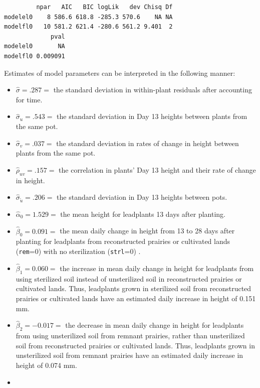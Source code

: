 \documentclass[
]{krantz}
\providecommand{\tightlist}{%
  \setlength{\itemsep}{0pt}\setlength{\parskip}{0pt}}
\begin{document}
\begin{verbatim}
         npar   AIC   BIC logLik   dev Chisq Df
modelel0    8 586.6 618.8 -285.3 570.6    NA NA
modelfl0   10 581.2 621.4 -280.6 561.2 9.401  2
             pval
modelel0       NA
modelfl0 0.009091
\end{verbatim}

Estimates of model parameters can be interpreted in the following manner:

\begin{itemize}
\tightlist
\item
  \(\hat{\sigma}=.287=\) the standard deviation in within-plant residuals after accounting for time.
\item
  \(\hat{\sigma}_{u}=.543=\) the standard deviation in Day 13 heights between plants from the same pot.
\item
  \(\hat{\sigma}_{v}=.037=\) the standard deviation in rates of change in height between plants from the same pot.
\item
  \(\hat{\rho}_{uv}=.157=\) the correlation in plants' Day 13 height and their rate of change in height.
\item
  \(\hat{\sigma}_{\tilde{u}}=.206=\) the standard deviation in Day 13 heights between pots.
\item
  \(\hat{\alpha}_{0}=1.529=\) the mean height for leadplants 13 days after planting.
\item
  \(\hat{\beta}_{0}=0.091=\) the mean daily change in height from 13 to 28 days after planting for leadplants from reconstructed prairies or cultivated lands (\texttt{rem}=0) with no sterilization (\texttt{strl}=0) .
\item
  \(\hat{\beta}_{1}=0.060=\) the increase in mean daily change in height for leadplants from using sterilized soil instead of unsterilized soil in reconstructed prairies or cultivated lands. Thus, leadplants grown in sterilized soil from reconstructed prairies or cultivated lands have an estimated daily increase in height of 0.151 mm.
\item
  \(\hat{\beta}_{2}=-0.017=\) the decrease in mean daily change in height for leadplants from using unsterilized soil from remnant prairies, rather than unsterilized soil from reconstructed prairies or cultivated lands. Thus, leadplants grown in unsterilized soil from remnant prairies have an estimated daily increase in height of 0.074 mm.
\item

\end{itemize}
\end{document}
